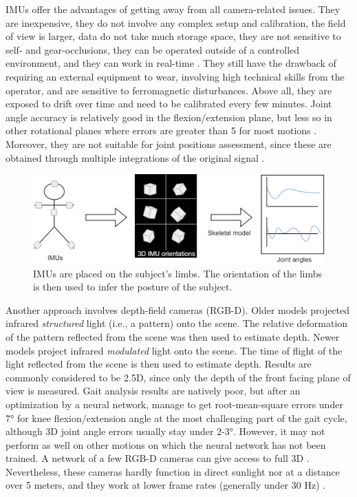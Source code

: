 IMUs offer the advantages of getting away from all camera-related issues. They are inexpensive, they do not involve any complex setup and calibration, the field of view is larger, data do not take much storage space, they are not sensitive to self- and gear-occlusions, they can be operated outside of a controlled environment, and they can work in real-time \cite{Johnston2019,Chambers2015}. They still have the drawback of requiring an external equipment to wear, involving high technical skills from the operator, and are sensitive to ferromagnetic disturbances. Above all, they are exposed to drift over time and need to be calibrated every few minutes. Joint angle accuracy is relatively good in the flexion/extension plane, but less so in other rotational planes where errors are greater than 5\degree{} for most motions \cite{Zhang2013, Rekant2022}. Moreover, they are not suitable for joint positions assessment, since these are obtained through multiple integrations of the original signal \cite{Ahmad2013}. 

\begin{figure}[hbtp]
	\centering
	\def\svgwidth{1\columnwidth}
	\fontsize{10pt}{10pt}\selectfont
	\includegraphics[width=\linewidth]{"../Chap1/Figures/Fig_IMUs.png"}
	\caption{IMUs are placed on the subject's limbs. The orientation of the limbs is then used to infer the posture of the subject.}
	\label{fig_imus}
\end{figure}
\FloatBarrier

Another approach involves depth-field cameras (RGB-D). Older models projected infrared \textit{structured} light (i.e., a pattern) onto the scene. The relative deformation of the pattern reflected from the scene was then used to estimate depth. Newer models project infrared \textit{modulated} light onto the scene. The time of flight of the light reflected from the scene is then used to estimate depth. Results are commonly considered to be 2.5D, since only the depth of the front facing plane of view is measured. Gait analysis results are natively poor, but after an optimization by a neural network, \cite{Guo2022} manage to get root-mean-square errors under 7° for knee flexion/extension angle at the most challenging part of the gait cycle, although 3D joint angle errors usually stay under 2-3°. However, it may not perform as well on other motions on which the neural network has not been trained. A network of a few RGB-D cameras can give access to full 3D \cite{Carraro2017,Choppin2013,Colombel2020}. Nevertheless, these cameras hardly function in direct sunlight nor at a distance over 5 meters, and they work at lower frame rates (generally under 30 Hz) \cite{Han2013, Pagliari2015}. 


